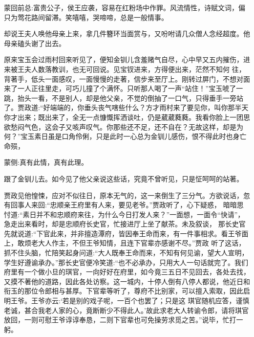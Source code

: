 

\begin{parag}
    \begin{note}蒙回前总:富贵公子，侯王应袭，容易在红粉场中作罪。风流情性，诗赋文词，偏只为莺花路间留滞。笑嘻嘻，哭啼啼，总是一般情事。\end{note}
\end{parag}


\begin{parag}
    却说王夫人唤他母亲上来，拿几件簪环当面赏与，又吩咐请几众僧人念经超度。他母亲磕头谢了出去。
\end{parag}


\begin{parag}
    原来宝玉会过雨村回来听见了，便知金钏儿含羞赌气自尽，心中早又五内摧伤，进来被王夫人数落教训，也无可回说。见宝钗进来，方得便出来，茫然不知何 往，背著手，低头一面感叹，一面慢慢的走著，信步来至厅上。刚转过屏门，不想对面来了一人正往里走，可巧儿撞了个满怀。只听那人喝了一声“站住！”宝玉唬了一跳，抬头一看，不是别人，却是他父亲，不觉的倒抽了一口气，只得垂手一旁站了。贾政道:“好端端的，你垂头丧气嗐些什么？方才雨村来了要见你，叫你那半天你才出来；既出来了，全无一点慷慨挥洒谈吐，仍是葳葳蕤蕤。我看你脸上一团思欲愁闷气色，这会子又咳声叹气。你那些还不足，还不自在？无故这样，却是为何？”宝玉素日虽是口角伶俐，只是此时一心总为金钏儿感伤，恨不得此时也身亡命殒，\begin{note}蒙侧:真有此情，真有此理。\end{note}跟了金钏儿去。如今见了他父亲说这些话，究竟不曾听见，只是怔呵呵的站著。
\end{parag}


\begin{parag}
    贾政见他惶悚，应对不似往日，原本无气的，这一来倒生了三分气。方欲说话，忽有回事人来回:“忠顺亲王府里有人来，要见老爷。”贾政听了，心下疑惑， 暗暗思忖道:“素日并不和忠顺府来往，为什么今日打发人来？”一面想，一面令“快请”，急走出来看时，却是忠顺府长史官，忙接进厅上坐了献茶。未及叙谈， 那长史官先就说道:“下官此来，并非擅造潭府，皆因奉王命而来，有一件事相求。看王爷面上，敢烦老大人作主，不但王爷知情，且连下官辈亦感谢不尽。”贾政 听了这话，抓不住头脑，忙陪笑起身问道:“大人既奉王命而来，不知有何见谕，望大人宣明，学生好遵谕承办。”那长史官便冷笑道:“也不必承办，只用大人一句话就完了。我们府里有一个做小旦的琪官，一向好好在府里，如今竟三五日不见回去，各处去找，又摸不著他的道路，因此各处访察。这一城内，十停人倒有八停人都说，他近日和衔玉的那位令郎相与甚厚。下官辈等听了，尊府不比别家，可以擅入索取，因此启明王爷。王爷亦云:‘若是别的戏子呢，一百个也罢了；只是这 琪官随机应答，谨慎老诚，甚合我老人家的心，竟断断少不得此人。’故此求老大人转谕令郎，请将琪官放回，一则可慰王爷谆谆奉恳，二则下官辈也可免操劳求觅之苦。”说毕，忙打一躬。
\end{parag}


